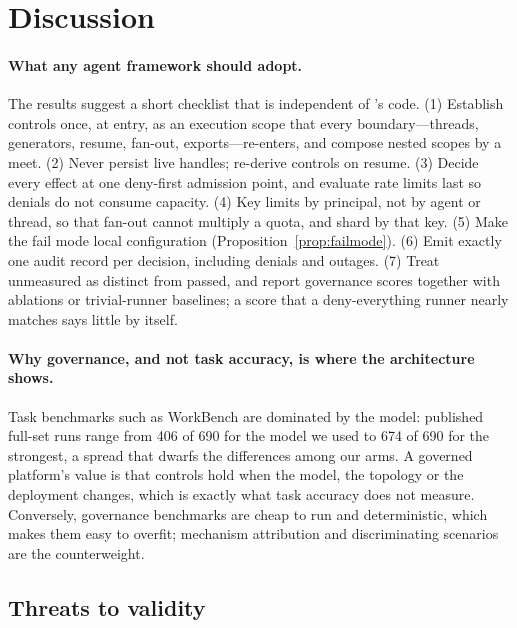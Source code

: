 \section{Discussion}
\label{sec:discussion}

\paragraph{What any agent framework should adopt.} The results suggest a short checklist that is independent of \method{}'s code. (1) Establish controls once, at entry, as an execution scope that every boundary---threads, generators, resume, fan-out, exports---re-enters, and compose nested scopes by a meet. (2) Never persist live handles; re-derive controls on resume. (3) Decide every effect at one deny-first admission point, and evaluate rate limits last so denials do not consume capacity. (4) Key limits by principal, not by agent or thread, so that fan-out cannot multiply a quota, and shard by that key. (5) Make the fail mode local configuration (Proposition~\ref{prop:failmode}). (6) Emit exactly one audit record per decision, including denials and outages. (7) Treat unmeasured as distinct from passed, and report governance scores together with ablations or trivial-runner baselines; a score that a deny-everything runner nearly matches says little by itself.

\paragraph{Why governance, and not task accuracy, is where the architecture shows.} Task benchmarks such as WorkBench are dominated by the model: published full-set runs range from 406 of 690 for the model we used to 674 of 690 for the strongest, a spread that dwarfs the differences among our arms. A governed platform's value is that controls hold when the model, the topology or the deployment changes, which is exactly what task accuracy does not measure. Conversely, governance benchmarks are cheap to run and deterministic, which makes them easy to overfit; mechanism attribution and discriminating scenarios are the counterweight.

\subsection{Threats to validity}
\label{sec:threats}
